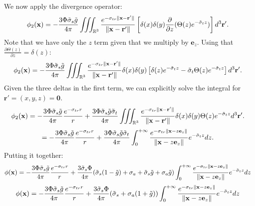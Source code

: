 \documentclass[10pt,a4paper]{article}
\begin{document}
We now apply the divergence operator:
$$
{\phi_2}(\mathbf{x}) = -\frac{3 \Phi \tilde{\sigma}_s \tilde{g}}{4 \pi} \iiint_{\mathbb{R}^3}  \frac{e^{-\sigma_{tr} \|\mathbf{x} - \mathbf{r}' \|}}{\|\mathbf{x} - \mathbf{r}' \|} \left[ \delta(x) \delta(y)
\frac{\partial}{\partial z}  (\Theta(z) e^{-\tilde{\sigma}_t z}) \right]  d^3 \mathbf{r}'.
$$
Note that we have only the $z$ term given that we multiply by $\mathbf{e}_z$.
Using that $\frac{\partial \Theta(z)}{\partial z} = \delta(z) $:
$$
{\phi_2}(\mathbf{x}) = -\frac{3 \Phi \tilde{\sigma}_s \tilde{g}}{4 \pi} \iiint_{\mathbb{R}^3}  \frac{e^{-\sigma_{tr} \|\mathbf{x} - \mathbf{r}' \|}}{\|\mathbf{x} - \mathbf{r}' \|}  \delta(x) \delta(y) \left[
\delta(z) e^{-\tilde{\sigma}_t z} - \tilde{\sigma}_t \Theta(z) e^{-\tilde{\sigma}_t z} \right]  d^3 \mathbf{r}'.
$$
Given the three deltas in the first term, we can explicitly solve the integral for $\mathbf{r'} = (x,y,z) = \mathbf{0}$. 
$$
{\phi_2}(\mathbf{x}) = -\frac{3 \Phi \tilde{\sigma}_s \tilde{g}}{4 \pi} \frac{e^{-\sigma_{tr} r}}{r} +\frac{3 \Phi \tilde{\sigma}_s \tilde{g} \tilde{\sigma}_t}{4 \pi} \iiint_{\mathbb{R}^3}  \frac{e^{-\sigma_{tr} \|\mathbf{x} - \mathbf{r}' \|}}{\|\mathbf{x} - \mathbf{r}' \|}  \delta(x) \delta(y)   \Theta(z) e^{-\tilde{\sigma}_t z}  d^3 \mathbf{r}'.
$$
$$
= -\frac{3 \Phi \tilde{\sigma}_s \tilde{g}}{4 \pi} \frac{e^{-\sigma_{tr} r}}{r} +\frac{3 \Phi \tilde{\sigma}_s \tilde{g} \tilde{\sigma}_t}{4 \pi} \int_{0}^{+\infty} \frac{e^{-\sigma_{tr} \|\mathbf{x} - z \mathbf{e}_z  \|}}{\|\mathbf{x} - z \mathbf{e}_z  \|}  e^{-\tilde{\sigma}_t z}  dz.
$$
Putting it together:
$$
{\phi}(\mathbf{x}) = -\frac{3 \Phi \tilde{\sigma}_s \tilde{g}}{4 \pi} \frac{e^{-\sigma_{tr} r}}{r} + \frac{3\tilde{\sigma}_s \Phi}{4 \pi} (\tilde{\sigma}_s (1 - \tilde{g}) + \sigma_a + \tilde{\sigma}_s \tilde{g} + \sigma_a  \tilde{g} ) \int_{0}^{+\infty} \frac{e^{-\sigma_{tr} \|\mathbf{x} - z \mathbf{e}_z  \|}}{\|\mathbf{x} - z \mathbf{e}_z  \|}  e^{-\tilde{\sigma}_t z}  dz
$$
$$
{\phi}(\mathbf{x}) = -\frac{3 \Phi \tilde{\sigma}_s \tilde{g}}{4 \pi} \frac{e^{-\sigma_{tr} r}}{r} + \frac{3\tilde{\sigma}_s \Phi}{4 \pi} (\tilde{\sigma}_s + \sigma_a  ( 1 + \tilde{g})) \int_{0}^{+\infty} \frac{e^{-\sigma_{tr} \|\mathbf{x} - z \mathbf{e}_z  \|}}{\|\mathbf{x} - z \mathbf{e}_z  \|}  e^{-\tilde{\sigma}_t z}  dz
\label{eq:phi}
$$
\end{document}
